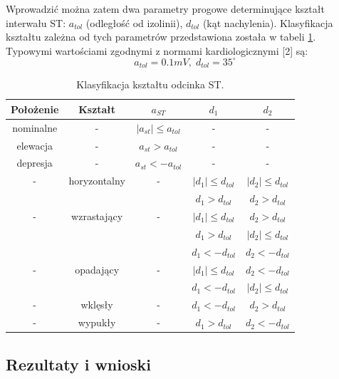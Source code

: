 Wprowadzić można zatem dwa parametry progowe determinujące kształt interwału ST: $ a_{tol} $ (odległość od izolinii), $ d_{tol} $ (kąt nachylenia). Klasyfikacja kształtu zależna od tych parametrów przedstawiona została w tabeli \ref{tab:ST_klasyfikacjaST}. Typowymi wartościami zgodnymi z normami kardiologicznymi [2] są:
\[ a_{tol} = 0.1 mV, \; d_{tol} = 35^\circ  \]
\begin{table}[H]
	\centering
	\caption{Klasyfikacja kształtu odcinka ST.}
	\label{tab:ST_klasyfikacjaST}
	\begin{tabular}{|c|c|c|c|c|}
	\hline
	Położenie & Kształt & $ a_{ST} $ & $ d_1 $ & $ d_2 $ \\ \hline
	nominalne	&	-	&	$ \left| a_{st} \right| \leq a_{tol} $	&	-	&	- \\ \hline
	elewacja	&	-	&	$ a_{st} > a_{tol} $					&	-	&	- \\ \hline
	depresja	&	-	&	$ a_{st} < -a_{tol} $					&	-	&	- \\ \hline
	- & horyzontalny & - & $ \left| d_1 \right| \leq d_{tol} $ & $ \left| d_2 \right| \leq d_{tol} $ \\ \hline
	\multirow{3}{*}{-} & \multirow{3}{*}{wzrastający} & \multirow{3}{*}{-} & $ d_1 > d_{tol} $						&	$ d_2 > d_{tol} $ \\ \cline{4-5}
	& & & $ \left| d_1 \right| \leq d_{tol} $	&	$ d_2 > d_{tol} $					\\ \cline{4-5}
	& & & $ d_1 > d_{tol} $						&	$ \left| d_2 \right| \leq d_{tol} $	\\ \hline
	\multirow{3}{*}{-} & \multirow{3}{*}{opadający} & \multirow{3}{*}{-} & $ d_1 < -d_{tol} $						&	$ d_2 < -d_{tol} $ \\ \cline{4-5}
	& & & $ \left| d_1 \right| \leq d_{tol} $	&	$ d_2 < -d_{tol} $					\\ \cline{4-5}
	& & & $ d_1 < -d_{tol} $					&	$ \left| d_2 \right| \leq d_{tol} $	\\ \hline
		-	&	wklęsły		&	-	&	$ d_1 < -d_{tol} $	&	$ d_2 > d_{tol} $	\\ \hline
		-	&	wypukły		&	-	&	$ d_1 > d_{tol}	$	&	$ d_2 < -d_{tol}$	\\ \hline
	\end{tabular}
\end{table}

\subsection{Rezultaty i wnioski}
